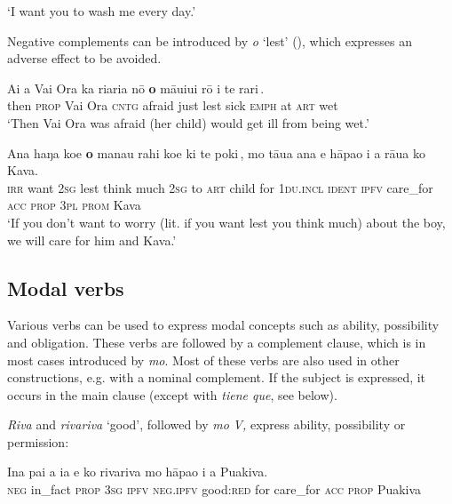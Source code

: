 \glt 
‘I want you to wash me every day.’ \textstyleExampleref{[R313.178]} 
\z

Negative complements can be introduced by \textit{{\ꞌ}o} ‘lest’ (), which expresses an adverse effect to be avoided.

\ea\label{ex:11.75}
\gll {\ꞌ}Ai a Vai Ora ka ri{\ꞌ}ari{\ꞌ}a nō {\ob}\textbf{{\ꞌ}o} māuiui rō {\ꞌ}i te rari\,{\cb}. \\
then \textsc{prop} Vai Ora \textsc{cntg} afraid just {\db}lest sick \textsc{emph} at \textsc{art} wet \\

\glt 
‘Then Vai Ora was afraid (her child) would get ill from being wet.’ \textstyleExampleref{[R301.151]} 
\z

\ea\label{ex:11.76}
\gll Ana haŋa koe {\ob}\textbf{{\ꞌ}o} mana{\ꞌ}u rahi koe ki te poki\,{\cb}, mo tāua {\ꞌ}ana  e hāpa{\ꞌ}o i a rāua ko Kava.\\
\textsc{irr} want \textsc{2sg} {\db}lest think much \textsc{2sg} to \textsc{art} child for \textsc{1du.incl} \textsc{ident}  \textsc{ipfv} care\_for \textsc{acc} \textsc{prop} \textsc{3pl} \textsc{prom} Kava\\

\glt 
‘If you don’t want to worry (lit. if you want lest you think much) about the boy, we will care for him and Kava.’ \textstyleExampleref{[R229.028]} 
\z
{}
\subsection{Modal verbs}\label{sec:11.3.6}
Various verbs can be used to express modal concepts such as ability, possibility and obligation. These verbs are followed by a complement clause, which is in most cases introduced by \textit{mo}. Most of these verbs are also used in other constructions, e.g. with a nominal complement. If the subject is expressed, it occurs in the main clause (except with \textit{tiene que}, see below).

\textit{Riva} and \textit{rivariva} ‘good’, followed by \textit{mo} \textit{V,} express ability, possibility or permission:

\ea\label{ex:11.77}
\gll {\ꞌ}Ina pa{\ꞌ}i a ia e ko rivariva mo hāpa{\ꞌ}o i a Puakiva. \\
\textsc{neg} in\_fact \textsc{prop} \textsc{3sg} \textsc{ipfv} \textsc{neg.ipfv} good:\textsc{red} for care\_for \textsc{acc} \textsc{prop} Puakiva \\

